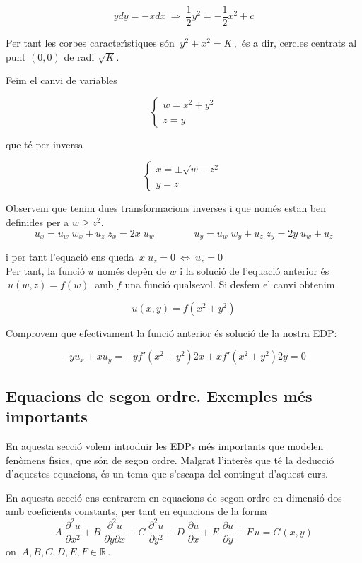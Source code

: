 \documentclass[12pt]{article}
\newcommand{\R}{\mathbb{R}}
\begin{document}
\[
 ydy=-xdx\ \Rightarrow \ \frac{1}{2}y^2=-\frac{1}{2}x^2+c
\]

Per tant les corbes caracter{\'\i}stiques s{\'o}n $\ y^2+x^2=K\,,$ {\'e}s a dir, cercles centrats al punt $(0,0)$ de radi $\sqrt{K}.$

Feim el canvi de variables

$$
\left\{
 \begin{array}{l}
w=x^2+y^2\\
 \\
z= y
 \end{array}
 \right.
$$

que t{\'e} per inversa

$$
\left\{
 \begin{array}{l}
x=\pm\sqrt{w-z^2}\\
 \\
y=z
\end{array}
 \right.
$$

Observem que tenim dues transformacions inverses i que nom{\'e}s estan ben definides per a $w\geq z^2.$
$$
u_x=u_w\; w_x+u_z\; z_x=2x\;u_w\qquad\qquad u_y=u_w\;w_y+u_z\;z_y=2y\;u_w+u_z
$$

i per tant l'equaci{\'o} ens queda $\ x\;u_z=0\ \Leftrightarrow\ u_z=0$\\


Per tant, la funci{\'o} $u$ nom{\'e}s dep{\`e}n de $w$ i la soluci{\'o} de l'equaci{\'o} anterior {\'e}s
$\ u(w,z)=f(w)\ $ amb $f$ una funci{\'o} qualsevol. Si desfem el canvi obtenim

\[
 u(x,y)=f(x^2+y^2)
\]

Comprovem que efectivament la funci{\'o} anterior {\'e}s soluci{\'o} de la nostra EDP:

\[
 -yu_x+xu_y=-yf'(x^2+y^2)2x+xf'(x^2+y^2)2y=0
\]



\subsection{Equacions de segon ordre. Exemples m{\'e}s importants}

En aquesta secci{\'o} volem introduir les EDPs m{\'e}s importants que modelen fen{\`o}mens f{\'\i}sics, que s{\'o}n de segon ordre.
Malgrat l'inter{\`e}s que t{\'e} la deducci{\'o} d'aquestes equacions, {\'e}s un tema que s'escapa del contingut d'aquest curs.

En aquesta secci{\'o} ens centrarem en equacions de segon ordre en dimensi{\'o} dos amb coeficients constants, per tant en equacions de la forma
\vspace{0.4cm}
\begin{equation}\label{segonordre}
 A\;\frac{\partial^2 u}{\partial x^2}+B\;\frac{\partial^2 u}{\partial y\partial x}+C\;\frac{\partial^2 u}{\partial y^2}+D\;\frac{\partial u}{\partial x}+E\;\frac{\partial u}{\partial y}+F\,u=G(x,y)
\end{equation}
on $\ A,B,C,D,E,F\in \R\,.$
\end{document}
